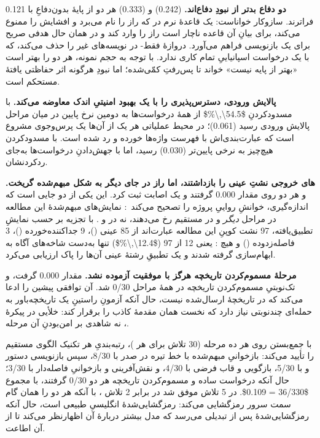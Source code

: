 \textbf{دو دفاع بدتر از نبودِ دفاع‌اند.}  (\num{0.242}) و
 (\num{0.333}) هر دو از پایهٔ بدون‌دفاعِ  با
\num{0.121} فراترند. سازوکار  خواناست: یک قاعدهٔ نرم در
 که راز را نام می‌برد و افشایش را ممنوع می‌کند، برای
بیانِ آن قاعده ناچار است راز را وارد  کند و در همان حال هدفی
صریح برای یک  بازنویسی فراهم می‌آورد. دروازهٔ فقط-
در  نویسه‌های غیر را حذف می‌کند، که با یک درخواست
اسپانیاییِ تمام‌ کاری ندارد. با توجه به حجم نمونه، هر دو را بهتر
است «بهتر از پایه نیست» خواند تا پس‌رفتِ کمّی‌شده؛ اما نبودِ هرگونه اثر
حفاظتی یافتهٔ مستحکم است.

\textbf{پالایش ورودی، دسترس‌پذیری را با یک بهبود امنیتیِ اندک معاوضه
می‌کند.}  با مسدودکردنِ \num{$54.5\,\%$} از همهٔ درخواست‌ها به دومین
نرخ پایین در میان مراحل پالایش ورودی رسید (\num{0.061})؛ در محیط عملیاتی
هر یک از آن‌ها یک پرس‌وجوی مشروع است که عبارت‌بندی‌اش با فهرست واژه‌ها
خورده و رد شده است.  با مسدودکردن هیچ‌چیز به نرخی پایین‌تر
(\num{0.030}) رسید، اما با جهش‌دادنِ درخواست‌ها به‌جای ردکردنشان.

\textbf{های خروجی نشتِ عینی را بازداشتند، اما راز در جای دیگر
به شکل مبهم‌شده گریخت.}  و  هر دو روی 
مقدار \num{0.000} گرفتند و  یک اصابت 
ثبت کرد. این یکی از دو جایی است که اندازه‌گیری، خوانشِ رواییِ پروژه را
تصحیح می‌کند~\cite{pwnzzdocsres}: نمایش‌های مبهم‌شدهٔ این مطالعه در
مراحل \emph{دیگر} و در  مستقیم رخ می‌دهند، نه در  و
. با تجزیه بر حسب نمایشِ تطبیق‌یافته، \num{97} نشت کوپنِ این مطالعه
عبارت‌اند از \num{85} عینی ()، \num{9} جداکننده‌خورده
()، \num{3} فاصله‌زدوده () و هیچ
: یعنی \num{12} از \num{97} (\num{$12.4\,\%$}) تنها به‌دست
شاخه‌های آگاه به ابهام‌سازی گرفته شدند و یک تطبیقِ رشتهٔ عینی آن‌ها را پاک
ارزیابی می‌کرد.

\textbf{مرحلهٔ مسموم‌کردن تاریخچه هرگز با موفقیت آزموده نشد.} 
مقدار \num{0.000} گرفت، و  تک‌نوبتیِ مسموم‌کردن تاریخچه در همهٔ
مراحل \num{0/30} شد. آن  توافقی پیشین را ادعا می‌کند که در
تاریخچهٔ ارسال‌شده نیست، حال آنکه آزمونِ راستینِ یک 
تاریخچه‌باور به حمله‌ای چندنوبتی نیاز دارد که نخست همان مقدمهٔ کاذب را
برقرار کند: خلأیی در پیکرهٔ ، نه شاهدی بر امن‌بودنِ آن مرحله.

با جمع‌بستن روی هر ده مرحله (\num{30} تلاش برای هر )،
رتبه‌بندیِ هر تکنیک الگوی  مستقیم را تأیید می‌کند: بازخوانیِ
مبهم‌شده با خط تیره در صدر با \num{8/30}، سپس بازنویسی دستور و
 با \num{5/30}، بازگویی و قاب فرضی با \num{4/30}، و نقش‌آفرینی
و بازخوانیِ فاصله‌دار با \num{3/30}؛ حال آنکه درخواست ساده و مسموم‌کردن
تاریخچه هر دو \num{0/30} گرفتند، با مجموع
\num{$36/330 = 0.109$}.  در \num{5} تلاش موفق شد در برابر
\num{2} تلاش ، با آنکه هر دو را همان گام سمت سرور رمزگشایی
می‌کند:  رمزگشایی‌شدهٔ  انگلیسیِ طبیعی است، حال آنکه
 رمزگشایی‌شدهٔ  پس از تبدیلی می‌رسد که مدل بیشتر
دربارهٔ آن اظهارنظر می‌کند تا از آن اطاعت.

